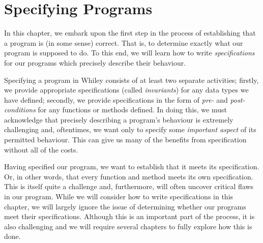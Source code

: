 \chapter{Specifying Programs}
In this chapter, we embark upon the first step in the process of establishing that a program is (in some sense) correct.  That is, to determine exactly what our program is supposed to do.  To this end, we will learn how to write {\em specifications} for our programs which precisely describe their behaviour.  

Specifying a program in Whiley consists of at least two separate activities;  firstly, we provide appropriate specifications (called
{\em invariants}) for any data types we have defined;  secondly, we provide specifications in the form of {\em pre-} and {\em post-conditions} for any functions or methods defined.  In doing this, we must acknowledge that precisely describing a program's behaviour is extremely challenging and, oftentimes, we want only to specify some {\em important aspect} of its permitted behaviour.  This can give us many of the benefits from specification without all of the costs.  

Having specified our program, we want to establish that it meets its specification.  Or, in other words, that every function and method meets its own specification.  This is itself quite a challenge and, furthermore, will often uncover critical flaws in our program.  While we will consider how to write specifications in this chapter, we will largely ignore the issue of determining whether our programs meet their specifications.  Although this is an important part of the process, it is also challenging and we will require several chapters to fully explore how this is done.

